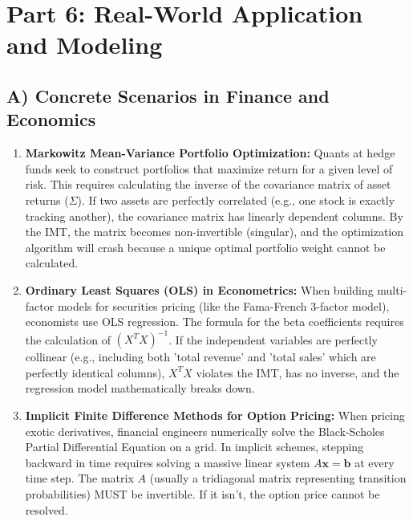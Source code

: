 \documentclass[12pt]{article}
\begin{document}
\section{Part 6: Real-World Application and Modeling}

\subsection{A) Concrete Scenarios in Finance and Economics}
\begin{enumerate}
    \item \textbf{Markowitz Mean-Variance Portfolio Optimization:} Quants at hedge funds seek to construct portfolios that maximize return for a given level of risk. This requires calculating the inverse of the covariance matrix of asset returns ($\Sigma$). If two assets are perfectly correlated (e.g., one stock is exactly tracking another), the covariance matrix has linearly dependent columns. By the IMT, the matrix becomes non-invertible (singular), and the optimization algorithm will crash because a unique optimal portfolio weight cannot be calculated.
    
    \item \textbf{Ordinary Least Squares (OLS) in Econometrics:} When building multi-factor models for securities pricing (like the Fama-French 3-factor model), economists use OLS regression. The formula for the beta coefficients requires the calculation of $(X^T X)^{-1}$. If the independent variables are perfectly collinear (e.g., including both 'total revenue' and 'total sales' which are perfectly identical columns), $X^T X$ violates the IMT, has no inverse, and the regression model mathematically breaks down.
    
    \item \textbf{Implicit Finite Difference Methods for Option Pricing:} When pricing exotic derivatives, financial engineers numerically solve the Black-Scholes Partial Differential Equation on a grid. In implicit schemes, stepping backward in time requires solving a massive linear system $A\mathbf{x} = \mathbf{b}$ at every time step. The matrix $A$ (usually a tridiagonal matrix representing transition probabilities) MUST be invertible. If it isn't, the option price cannot be resolved.
\end{enumerate}
\end{document}
